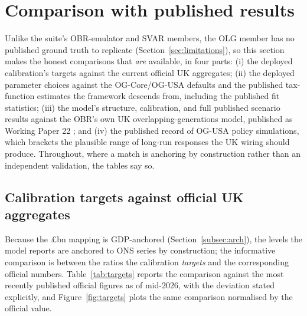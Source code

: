 \section{Comparison with published results}
\label{sec:comparison}

Unlike the suite's OBR-emulator and SVAR members, the OLG member has no published ground truth to replicate (Section~\ref{sec:limitations}), so this section makes the honest comparisons that \emph{are} available, in four parts: (i) the deployed calibration's targets against the current official UK aggregates; (ii) the deployed parameter choices against the OG-Core/OG-USA defaults and the published \citet{DeBackerEvansPhillips2019} tax-function estimates the framework descends from, including the published fit statistics; (iii) the model's structure, calibration, and full published scenario results against the OBR's own UK overlapping-generations model, published as Working Paper 22 \citep{OBR2025OLG}; and (iv) the published record of OG-USA policy simulations, which brackets the plausible range of long-run responses the UK wiring should produce. Throughout, where a match is anchoring by construction rather than an independent validation, the tables say so.

\subsection{Calibration targets against official UK aggregates}
\label{subsec:targets}

Because the \pounds bn mapping is GDP-anchored (Section~\ref{subsec:arch}), the levels the model reports are anchored to ONS series by construction; the informative comparison is between the ratios the calibration \emph{targets} and the corresponding official numbers. Table~\ref{tab:targets} reports the comparison against the most recently published official figures as of mid-2026, with the deviation stated explicitly, and Figure~\ref{fig:targets} plots the same comparison normalised by the official value.

